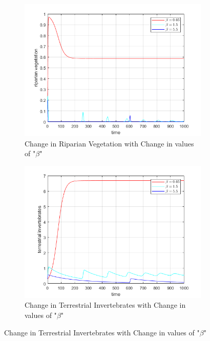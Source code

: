 \documentclass[12pt]{article}
\numberwithin{equation}{section}
\begin{document}
\FloatBarrier
\begin{figure}[bp!]
	\centering
	\begin{subfigure}[t]{0.45\textwidth}
		\centering
	\includegraphics[width=\textwidth]{time_vs_riparian_beta.png}
		\caption{Change in Riparian Vegetation with Change in values of "$\beta$"} \label{fig:time_vs_riparian_beta}
	\end{subfigure}
\hspace{0.08\textwidth}
        \begin{subfigure}[t]{0.45\textwidth}
                 \centering
         \includegraphics[width=\textwidth]{time_vs_invertebrates_beta.png}
		\caption{Change in Terrestrial Invertebrates with Change in values of "$\beta$"} \label{fig:time_vs_invertebrates_beta}

\end{subfigure}
\end{figure}
\end{document}
